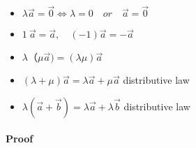 \documentclass[11pt]{book}
\begin{document}
\begin{itemize}
\item $\lambda \vec a =\vec 0 \iff \lambda = 0 \quad or \quad  \vec  a = \vec 0 $
\item $1 \ \vec a=\vec a,\quad (-1)\vec a = - \vec  a$
\item $\lambda（\mu \vec a ) = (\lambda \mu )\vec  a$
\item $(\lambda + \mu )\vec  a = \lambda \vec a  + \mu \vec a$ distributive law 
\item $\lambda (\vec  a + \vec  b)= \lambda \vec a + \lambda \vec  b$ distributive law 
\end{itemize}

\paragraph{Proof}
\end{document}
